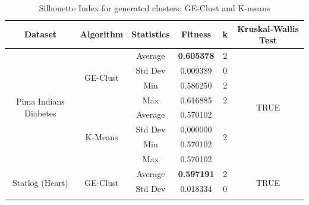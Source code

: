 \documentclass[conference]{IEEEtran}
\begin{document}
	
	\begin{table}[]
		\centering
		\caption{Silhouette Index for generated clusters: GE-Clust and K-means}
		\label{results-ge-and-kmeans}
		\begin{tabular}{|c|c|c|c|c|c|}
			\hline
			\textbf{Dataset}           & \textbf{Algorithm} & \textbf{Statistics} & \textbf{Fitness} & \textbf{k}    & \textbf{Kruskal-Wallis Test}   \\ \hline
			\multirow{8}{*}{Pima Indians Diabetes} & \multirow{4}{*}{GE-Clust}           & Average                        & \textbf{0.605378}                    & 2                        & \multirow{8}{*}{TRUE} \\ \cline{3-5}
			&                               & Std Dev                        & 0.009389                    & 0                        &                       \\ \cline{3-5}
			&                               & Min                            & 0.586250                    & 2                        &                       \\ \cline{3-5}
			&                               & Max                            & 0.616885                   & 2                        &                       \\ \cline{2-5}
			& \multirow{4}{*}{K-Means}      & Average                        & 0.570102                   & \multirow{4}{*}{2} &                       \\ \cline{3-4}
			&                               & Std Dev                        & 0,000000                   &                          &                       \\ \cline{3-4}
			&                               & Min                            & 0.570102                   &                          &                       \\ \cline{3-4}
			&                               & Max                            & 0.570102                   &                          &                       \\ \hline
			\multirow{8}{*}{Statlog (Heart)}       & \multirow{4}{*}{GE-Clust}           & Average                        & \textbf{0.597191}                    & 2                        & \multirow{8}{*}{TRUE} \\ \cline{3-5}
			&                               & Std Dev                        & 0.018334                    & 0                        &                       \\ \cline{3-5}

\end{tabular}
\end{table}
\end{document}

